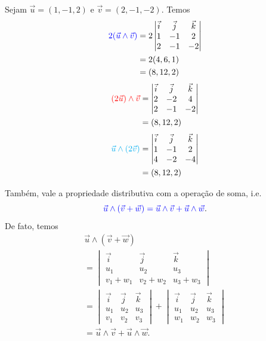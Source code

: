 \begin{ex}
  Sejam $\vec{u}=(1,-1,2)$ e $\vec{v}=(2,-1,-2)$. Temos
  \begin{align}
    {\color{blue}2(\vec{u}\land\vec{v})} &=
    2\begin{vmatrix}
      \vec{i} & \vec{j} & \vec{k} \\
      1 & -1 & 2 \\
      2 & -1 & -2
    \end{vmatrix}\\
                           &= 2(4,6,1)\\
                           &= (8,12,2)
  \end{align}
  \begin{align}
    {\color{red}(2\vec{u})\land\vec{v}} &=
    \begin{vmatrix}
      \vec{i} & \vec{j} & \vec{k} \\
      2 & -2 & 4 \\
      2 & -1 & -2
    \end{vmatrix}\\
                           &= (8,12,2)
  \end{align}
  \begin{align}
    {\color{cyan}\vec{u}\land(2\vec{v})} &=
    \begin{vmatrix}
      \vec{i} & \vec{j} & \vec{k} \\
      1 & -1 & 2 \\
      4 & -2 & -4
    \end{vmatrix}\\
                           &= (8,12,2)
  \end{align}
\end{ex}


Também, vale a {\color{blue}propriedade distributiva com a operação de soma}, i.e.
\begin{equation}
  {\color{blue}\vec{u}\land(\vec{v} + \vec{w}) = \vec{u}\land\vec{v}+\vec{u}\land\vec{w}}.
\end{equation}
De fato, temos
\begin{gather}
  \vec{u}\land(\vec{v}+\vec{w}) \\
  = \begin{vmatrix}
    \vec{i} & \vec{j} & \vec{k} \\
    u_1 & u_2 & u_3 \\
    v_1+w_1 & v_2+w_2 & u_3+w_3
  \end{vmatrix} \\
  = \begin{vmatrix}
    \vec{i} & \vec{j} & \vec{k} \\
    u_1 & u_2 & u_3 \\
    v_1 & v_2 & v_3
  \end{vmatrix}
  +  \begin{vmatrix}
    \vec{i} & \vec{j} & \vec{k} \\
    u_1 & u_2 & u_3 \\
    w_1 & w_2 & w_3
  \end{vmatrix}\\
  = \vec{u}\land\vec{v} + \vec{u}\land\vec{w}.
\end{gather}

